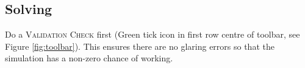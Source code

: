 \documentclass[11pt]{article}
\begin{document}
\begin{comment}
additional notes from the internet

1) Fast Sweep
The fast sweep finds the "poles and zeros" of the problem to calculate S-parameters. Fast sweep should be your "default" as long as Fmax/Fmin < 4 (rule of thumb). Fields are available on all frequencies.

2) Interpolating Sweeps
This sweep is ussually used when a DC solution is needed or a very broadband sweep Fmax/Fmin > 4. HFSS chooses which frequency points are "ideal" for interplating the S-parameters. The downside is that it does not produce fields (just S/Y/Z parameters). If you require a field solution in a specific frequency use an interpolating sweep together with a single frequency discrete sweep (use the same Setup - to reuse the mesh from the interpolating sweep).

BTW - together with the new DC thickness option, HFSSv10 is now used to produce highly accurate S-parameters from DC through MHz up to tens of GHz (and beyond). In the past users were required to solve inside metal which increased the simulation time.

When simulating very broadband S-parameters, one may want to use two interpolating sweeps. The first one up to the third harmonic with a high interpolation accuracy and the second sweep complementing to the fifth harmonic with reduced interpolation accuracy. HFSS interpolation in high frequencies is always superior to that of a circuit simulator.

3)Discrete Sweeps
Discrete sweeps are rarely used. Some engineers that require only 5 or 10 frequency points claim that discrete sweep may be faster. 
Discrete is the only sweep where the simulation time is proportional to the number of frequency points specified. 
I only use it to calculate fileds after doing an interpolating sweep.

\end{comment}


\subsection{Solving}

Do a \textsc{Validation Check} first (Green tick icon in first row centre of toolbar, see Figure \ref{fig:toolbar}). This ensures there are no glaring errors so that the simulation has a non-zero chance of working.
\end{document}
